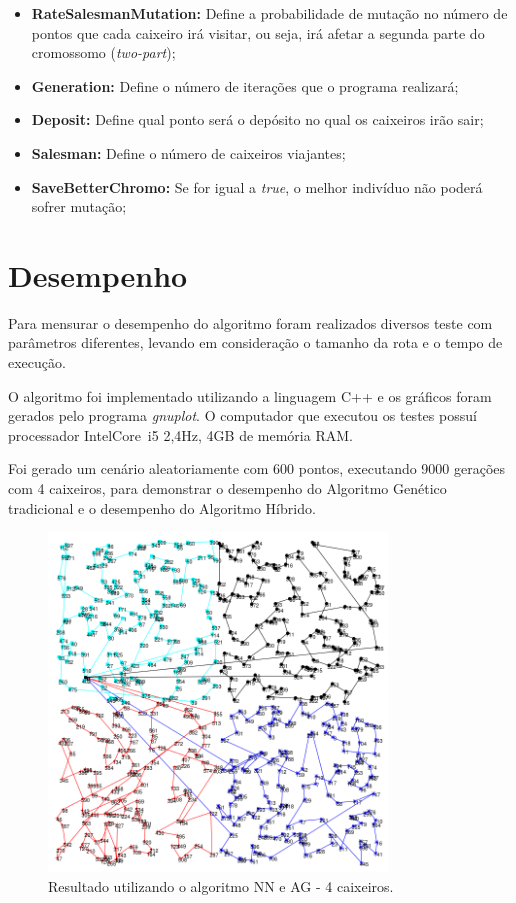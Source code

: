 \documentclass{abnt}
\begin{document}
\begin{itemize}
				\item \textbf{RateSalesmanMutation:} Define a probabilidade de mutação no número de pontos que cada caixeiro irá visitar, ou seja, irá afetar a segunda parte do cromossomo (\textit{two-part});
				\item \textbf{Generation:} Define o número de iterações que o programa realizará;
				\item \textbf{Deposit:} Define qual ponto será o depósito no qual os caixeiros irão sair;
				\item \textbf{Salesman:} Define o número de caixeiros viajantes;
				\item \textbf{SaveBetterChromo:} Se for igual a \textit{true}, o melhor indivíduo não poderá sofrer mutação;
			\end{itemize}
			
		\section{Desempenho}
		
		Para mensurar o desempenho do algoritmo foram realizados diversos teste com parâmetros diferentes, levando em consideração o tamanho da rota e o tempo de execução.
		
		O algoritmo foi implementado utilizando a linguagem C++ e os gráficos foram gerados pelo programa \textit{gnuplot}.
		O computador que executou os testes possuí processador Intel\textregistered Core\texttrademark ~i5 2,4Hz, 4GB de memória RAM.
		
		Foi gerado um cenário aleatoriamente com 600 pontos, executando 9000 gerações com 4 caixeiros,  para demonstrar o desempenho do Algoritmo Genético tradicional e o desempenho do Algoritmo Híbrido.
		

		\begin{figure}[h]
				\centering
		        \includegraphics[width = 9cm,keepaspectratio]{img/ga-nn.png}
		        \caption{Resultado utilizando o algoritmo NN e AG - 4 caixeiros.}
		        \label{ga-nn}
	   		\end{figure}
		
\end{document}
